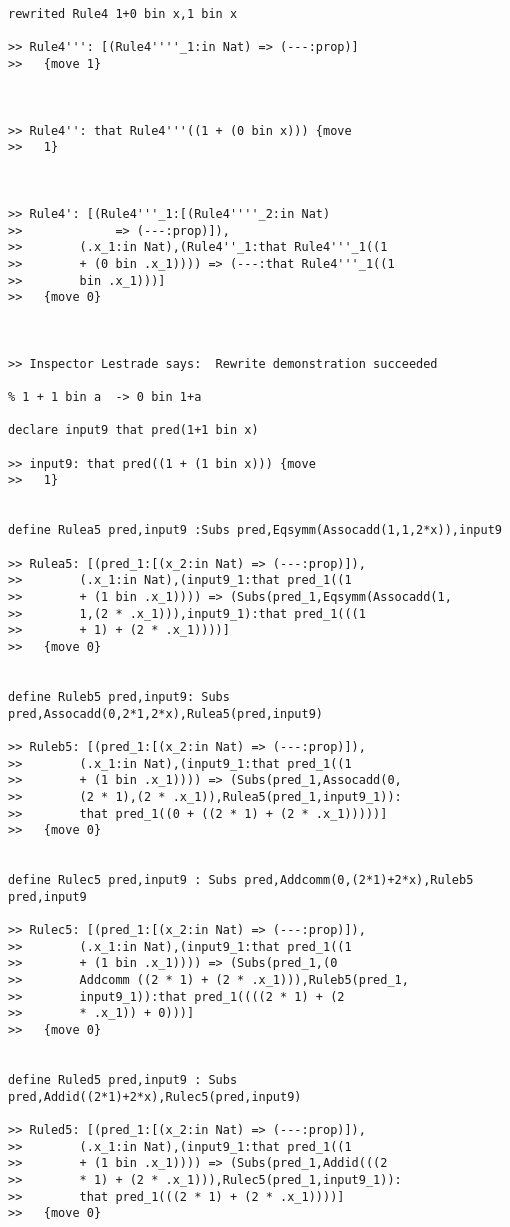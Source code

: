 \documentclass{article}
\begin{document}
\begin{verbatim}
rewrited Rule4 1+0 bin x,1 bin x

>> Rule4''': [(Rule4''''_1:in Nat) => (---:prop)]
>>   {move 1}



>> Rule4'': that Rule4'''((1 + (0 bin x))) {move 
>>   1}



>> Rule4': [(Rule4'''_1:[(Rule4''''_2:in Nat) 
>>             => (---:prop)]),
>>        (.x_1:in Nat),(Rule4''_1:that Rule4'''_1((1 
>>        + (0 bin .x_1)))) => (---:that Rule4'''_1((1 
>>        bin .x_1)))]
>>   {move 0}



>> Inspector Lestrade says:  Rewrite demonstration succeeded

% 1 + 1 bin a  -> 0 bin 1+a

declare input9 that pred(1+1 bin x)

>> input9: that pred((1 + (1 bin x))) {move 
>>   1}


define Rulea5 pred,input9 :Subs pred,Eqsymm(Assocadd(1,1,2*x)),input9

>> Rulea5: [(pred_1:[(x_2:in Nat) => (---:prop)]),
>>        (.x_1:in Nat),(input9_1:that pred_1((1 
>>        + (1 bin .x_1)))) => (Subs(pred_1,Eqsymm(Assocadd(1,
>>        1,(2 * .x_1))),input9_1):that pred_1(((1 
>>        + 1) + (2 * .x_1))))]
>>   {move 0}


define Ruleb5 pred,input9: Subs pred,Assocadd(0,2*1,2*x),Rulea5(pred,input9)

>> Ruleb5: [(pred_1:[(x_2:in Nat) => (---:prop)]),
>>        (.x_1:in Nat),(input9_1:that pred_1((1 
>>        + (1 bin .x_1)))) => (Subs(pred_1,Assocadd(0,
>>        (2 * 1),(2 * .x_1)),Rulea5(pred_1,input9_1)):
>>        that pred_1((0 + ((2 * 1) + (2 * .x_1)))))]
>>   {move 0}


define Rulec5 pred,input9 : Subs pred,Addcomm(0,(2*1)+2*x),Ruleb5 pred,input9

>> Rulec5: [(pred_1:[(x_2:in Nat) => (---:prop)]),
>>        (.x_1:in Nat),(input9_1:that pred_1((1 
>>        + (1 bin .x_1)))) => (Subs(pred_1,(0 
>>        Addcomm ((2 * 1) + (2 * .x_1))),Ruleb5(pred_1,
>>        input9_1)):that pred_1((((2 * 1) + (2 
>>        * .x_1)) + 0)))]
>>   {move 0}


define Ruled5 pred,input9 : Subs pred,Addid((2*1)+2*x),Rulec5(pred,input9)

>> Ruled5: [(pred_1:[(x_2:in Nat) => (---:prop)]),
>>        (.x_1:in Nat),(input9_1:that pred_1((1 
>>        + (1 bin .x_1)))) => (Subs(pred_1,Addid(((2 
>>        * 1) + (2 * .x_1))),Rulec5(pred_1,input9_1)):
>>        that pred_1(((2 * 1) + (2 * .x_1))))]
>>   {move 0}



\end{verbatim}
\end{document}
